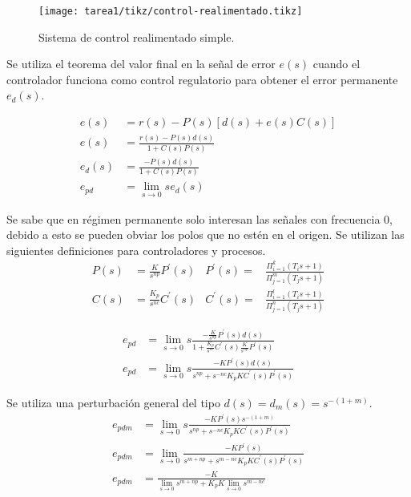 \begin{ejercicio}
  \begin{figure}[H]
      \centering
      \texttt{[image: tarea1/tikz/control-realimentado.tikz]}
      \caption{Sistema de control realimentado simple.}
      \label{img:ejercicio1}
  \end{figure}

  Se utiliza el teorema del valor final en la señal de error $e(s)$ cuando el controlador funciona como control regulatorio para obtener el error permanente $e_d(s)$.

  \begin{align*}
    e(s) &= r(s) - P(s)\left[d(s)+e(s) C(s)\right]
    \\ \tag{Señal de error}
    e(s) &= \frac{r(s) - P(s)d(s)}{1+C(s) P(s)}
    \\ \tag{Error de control regulatorio}
    e_d(s) &= \frac{-P(s) d(s)}{1+C(s)P(s)}
    \\ \tag{Teorema del valor final}
    e_{pd} &= \lim_{s\rightarrow 0} s e_d(s)
  \end{align*}

  Se sabe que en régimen permanente solo interesan las señales con frecuencia 0, debido a esto se pueden obviar los polos que no estén en el origen. Se utilizan las siguientes definiciones para controladores y procesos.
  \begin{align*}
    P(s) &= \frac{K}{s^{np}}P^{'}(s) & P^{'}(s) =& \frac{\Pi_{i=1}^{k}(T_i s +1)}{\Pi_{j=1}^{m}(T_j s +1)}
    \\
    C(s) &= \frac{K_p}{s^{nc}}C^{'}(s) & C^{'}(s) =& \frac{\Pi_{i=1}^{l}(T_i s +1)}{\Pi_{j=1}^{n}(T_j s +1)}
  \end{align*}

  \begin{align*}
    e_{pd} &= \lim_{s\rightarrow 0} s \frac{-\frac{K}{s^{np}}P^{'}(s) d(s)}
    {1+ \frac{K_p}{s^{nc}}C^{'}(s) \frac{K}{s^{np}}P^{'}(s)}
    \\
    e_{pd} &= \lim_{s\rightarrow 0} s \frac{-K P^{'}(s) d(s)}
    {s^{np} + s^{-nc} K_p K C^{'}(s) P^{'}(s)}
  \end{align*}

  Se utiliza una perturbación general del tipo $d(s)=d_m(s)=s^{-(1+m)}$.
  \begin{align*}
    e_{pdm} &= \lim_{s\rightarrow 0} s \frac{-K P^{'}(s) s^{-(1+m)}}
    {s^{np} + s^{-nc} K_p K C^{'}(s) P^{'}(s)}
    \\
    e_{pdm} &= \lim_{s\rightarrow 0} \frac{-K P^{'}(s)}
    {s^{m+np} + s^{m-nc} K_p K C^{'}(s) P^{'}(s)}
    \\ \tag{error permanente ante perturbación general}
    e_{pdm} &= \frac{-K}
    {\lim_{s\rightarrow 0}s^{m+np} + K_p K\lim_{s\rightarrow 0} s^{m-nc}}
  \end{align*}


\end{ejercicio}
